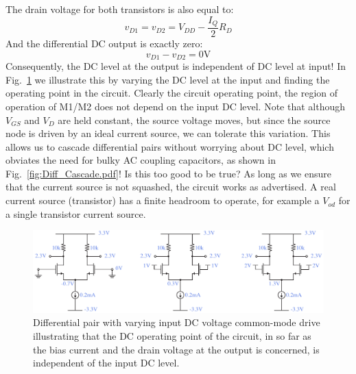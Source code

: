 The drain voltage for both transistors is also equal to:
    \begin{equation}
        {v_{D1}} = {v_{D2}} = {V_{DD}} - \frac{I_Q}{2}{R_D}  
    \end{equation}
And the differential DC output is exactly zero:
    \begin{equation}
        {v_{D1}} - {v_{D2}} = 0\mathrm{V}
    \end{equation}
Consequently, the DC level at the output is independent of DC level at input! In Fig.~\ref{fig:diff_amp_bias_cm.pdf} we illustrate this by varying the DC level at the input and finding the operating point in the circuit.  Clearly the circuit operating point, the region of operation of M1/M2 does not depend on the input DC level.  Note that although $V_{GS}$ and $V_{D}$ are held constant, the source voltage moves, but since the source node is driven by an ideal current source, we can tolerate this variation.  This allows us to cascade differential pairs without worrying about DC level, which obviates the need for bulky AC coupling capacitors, as shown in Fig.~\ref{fig:Diff_Cascade.pdf}! Is this too good to be true?  As long as we ensure that the current source is not squashed, the circuit works as advertised.  A real current source (transistor) has a finite headroom to operate, for example a $V_{od}$ for a single transistor current source.
\begin{figure}[tb]
\centering
\includegraphics[width=\columnwidth]{diff_amp_bias_cm.pdf}
\caption{Differential pair with varying input DC voltage common-mode drive illustrating that the DC operating point of the circuit, in so far as the bias current and the drain voltage at the output is concerned, is independent of the input DC level.}
\label{fig:diff_amp_bias_cm.pdf}
\end{figure}
